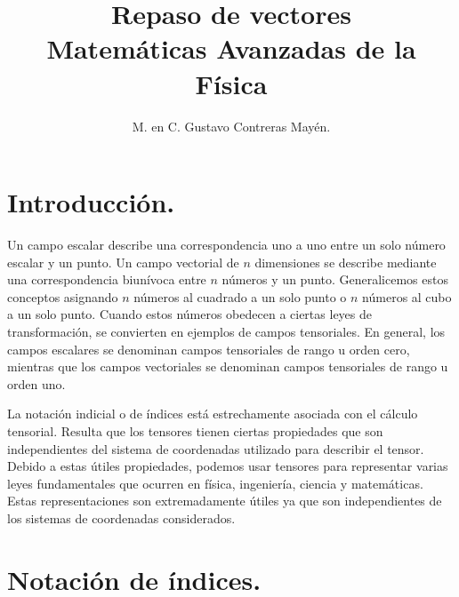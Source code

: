
\setlength{\tabcolsep}{12pt}
\title{Repaso de vectores \\ \large{Matemáticas Avanzadas de la Física}\vspace{-3ex}}
\author{M. en C. Gustavo Contreras Mayén.}
\date{ }

\vspace{-4cm}
\maketitle
\fontsize{14}{14}\selectfont
\section{Introducción.}
Un campo escalar describe una correspondencia uno a uno entre un solo número escalar y un punto. Un campo vectorial de $n$ dimensiones se describe mediante una correspondencia biunívoca entre $n$ números y un punto. Generalicemos estos conceptos asignando $n$ números al cuadrado a un solo punto o $n$ números al cubo a un solo punto. Cuando estos números obedecen a ciertas leyes de transformación, se convierten en ejemplos de campos tensoriales. En general, los campos escalares se denominan campos tensoriales de rango u orden cero, mientras que los campos vectoriales se denominan campos tensoriales de rango u orden uno.
\par
La notación indicial o de índices está estrechamente asociada con el cálculo tensorial. Resulta que los tensores tienen ciertas propiedades que son independientes del sistema de coordenadas utilizado para describir el tensor. Debido a estas útiles propiedades, podemos usar tensores para representar varias leyes fundamentales que ocurren en física, ingeniería, ciencia y matemáticas. Estas representaciones son extremadamente útiles ya que son independientes de los sistemas de coordenadas considerados.

\section{Notación de índices.}

